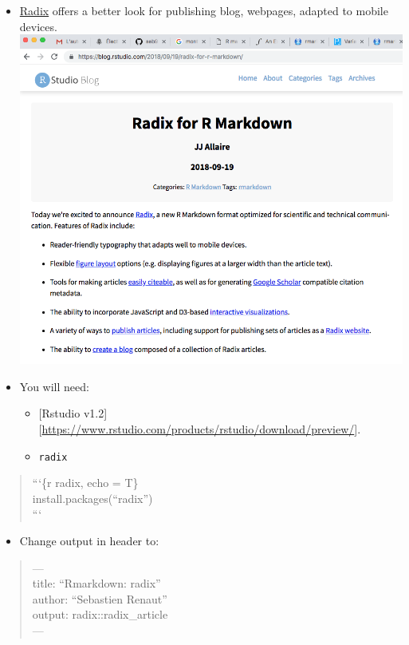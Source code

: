 \documentclass[]{article}
\providecommand{\tightlist}{%
  \setlength{\itemsep}{0pt}\setlength{\parskip}{0pt}}
\begin{document}
\begin{itemize}
\item
  \href{https://blog.rstudio.com/2018/09/19/radix-for-r-markdown/}{Radix}
  offers a better look for publishing blog, webpages, adapted to mobile
  devices.\\
  \includegraphics[width=5.20833in,height=\textheight]{../figures/radix.png}
\item
  You will need:

  \begin{itemize}
  \tightlist
  \item
    {[}Rstudio
    v1.2{]}{[}\url{https://www.rstudio.com/products/rstudio/download/preview/}{]}.\\
  \item
    \texttt{radix}
  \end{itemize}
\end{itemize}

\begin{quote}
```\{r radix, echo = T\}\\
install.packages(``radix'')\\
```
\end{quote}

\begin{itemize}
\tightlist
\item
  Change output in header to:
\end{itemize}

\begin{quote}
---\\
title: ``Rmarkdown: radix''\\
author: ``Sebastien Renaut''\\
output: radix::radix\_article\\
---
\end{quote}
\end{document}
